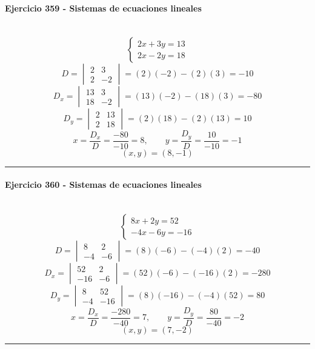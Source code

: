 \documentclass[10pt,a4paper]{article}
\newcommand{\res}[1]{\paragraph{#1}\mbox{}\\[-1.2em]}
\begin{document}
\res{Ejercicio 359 - Sistemas de ecuaciones lineales}
\[ \begin{cases}2 x + 3 y=13\\2 x - 2 y=18\end{cases} \]
\[ D=\begin{vmatrix}2&3\\2&-2\end{vmatrix}=(2)(-2)-(2)(3)=-10 \]
\[ D_x=\begin{vmatrix}13&3\\18&-2\end{vmatrix}=(13)(-2)-(18)(3)=-80 \]
\[ D_y=\begin{vmatrix}2&13\\2&18\end{vmatrix}=(2)(18)-(2)(13)=10 \]
\[ x=\frac{D_x}{D}=\frac{-80}{-10}=8,\qquad y=\frac{D_y}{D}=\frac{10}{-10}=-1 \]
\[ \boxed{(x,y)=(8,-1)} \]
\vspace{1mm}\hrule\vspace{2mm}
\res{Ejercicio 360 - Sistemas de ecuaciones lineales}
\[ \begin{cases}8 x + 2 y=52\\- 4 x - 6 y=-16\end{cases} \]
\[ D=\begin{vmatrix}8&2\\-4&-6\end{vmatrix}=(8)(-6)-(-4)(2)=-40 \]
\[ D_x=\begin{vmatrix}52&2\\-16&-6\end{vmatrix}=(52)(-6)-(-16)(2)=-280 \]
\[ D_y=\begin{vmatrix}8&52\\-4&-16\end{vmatrix}=(8)(-16)-(-4)(52)=80 \]
\[ x=\frac{D_x}{D}=\frac{-280}{-40}=7,\qquad y=\frac{D_y}{D}=\frac{80}{-40}=-2 \]
\[ \boxed{(x,y)=(7,-2)} \]
\vspace{1mm}\hrule\vspace{2mm}
\end{document}
